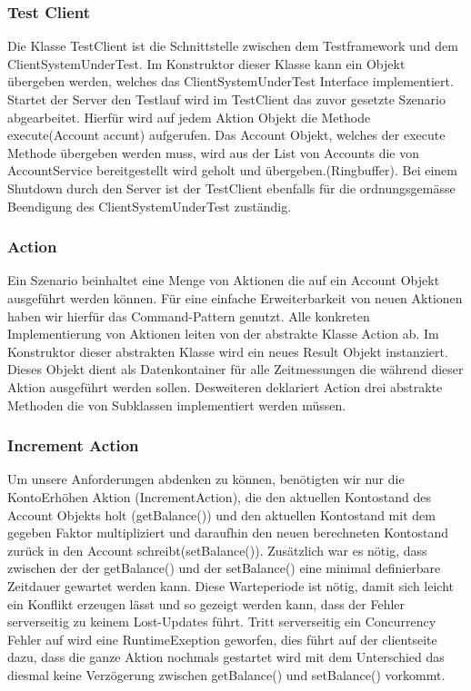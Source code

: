 \subsubsection{Test Client}
\label{sec:testclient}
Die Klasse TestClient ist die Schnittstelle zwischen dem Testframework und dem ClientSystemUnderTest. Im Konstruktor dieser Klasse kann ein Objekt übergeben werden, welches das ClientSystemUnderTest Interface implementiert. Startet der Server den Testlauf wird im TestClient das zuvor gesetzte Szenario abgearbeitet. Hierfür wird auf jedem Aktion Objekt die Methode execute(Account accunt) aufgerufen. Das Account Objekt, welches der execute Methode übergeben werden muss, wird aus der List von Accounts die von AccountService bereitgestellt wird geholt und übergeben.(Ringbuffer). Bei einem Shutdown durch den Server ist der TestClient ebenfalls für die ordnungsgemässe Beendigung des ClientSystemUnderTest zuständig.

\subsubsection{Action}
\label{sec:action}
Ein Szenario beinhaltet eine Menge von Aktionen die auf ein Account Objekt ausgeführt werden können. Für eine einfache Erweiterbarkeit von neuen Aktionen haben wir hierfür das Command-Pattern genutzt. Alle konkreten Implementierung von Aktionen leiten von der abstrakte Klasse Action ab. Im Konstruktor  dieser abstrakten Klasse wird ein neues Result Objekt instanziert. Dieses Objekt dient als Datenkontainer für alle Zeitmessungen die während dieser Aktion ausgeführt werden sollen. Desweiteren deklariert Action drei abstrakte Methoden die von Subklassen implementiert werden müssen.
 
\subsubsection{Increment Action}
\label{sec:incrementAction}
Um unsere Anforderungen abdenken zu können, benötigten wir nur die KontoErhöhen Aktion (IncrementAction), die den aktuellen Kontostand des Account Objekts holt (getBalance()) und den aktuellen Kontostand mit dem gegeben Faktor multipliziert und daraufhin den neuen berechneten Kontostand zurück in den Account schreibt(setBalance()). Zusätzlich war es nötig, dass zwischen der der getBalance() und der setBalance() eine minimal definierbare Zeitdauer gewartet werden kann. Diese Warteperiode ist nötig, damit sich leicht ein Konflikt erzeugen lässt und so gezeigt werden kann, dass der Fehler serverseitig zu keinem Lost-Updates führt. Tritt serverseitig ein Concurrency Fehler auf wird eine RuntimeExeption geworfen, dies führt auf der clientseite dazu, dass die ganze Aktion nochmals gestartet wird mit dem Unterschied das diesmal keine Verzögerung zwischen getBalance() und setBalance() vorkommt.

